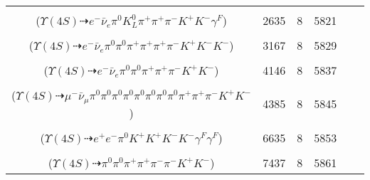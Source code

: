 \documentclass[landscape]{article}
\newcounter{rownumbers}
\newcommand\rn{\stepcounter{rownumbers}\arabic{rownumbers}}
\newcommand{\EOL}{\\} %
\newcommand{\topoTags}[1]{#1} %
\begin{document}
\begin{longtable}{clcccc}
\rn & \makecell[l]{ $ 
\Upsilon(4S) \rightarrow B^{0} \bar{B}^{0} ,
B^{0} \rightarrow \pi^{0} K^{+} K^{-} ,
\bar{B}^{0} \rightarrow e^{-} \bar{\nu}_{e} D^{*+} \gamma^{F} ,
D^{*+} \rightarrow \pi^{+} D^{0} ,
D^{0} \rightarrow K_{L}^{0} \pi^{+} \pi^{-} 
$ \\ ($
\Upsilon(4S) \dashrightarrow e^{-} \bar{\nu}_{e} \pi^{0} K_{L}^{0} \pi^{+} \pi^{+} \pi^{-} K^{+} K^{-} \gamma^{F} 
$) } & \topoTags{2635 & }8 & 5821 \EOL

\rn & \makecell[l]{ $ 
\Upsilon(4S) \rightarrow B^{0} \bar{B}^{0} ,
B^{0} \rightarrow \pi^{0} K^{+} K^{-} ,
\bar{B}^{0} \rightarrow e^{-} \bar{\nu}_{e} D^{*+} ,
D^{*+} \rightarrow \pi^{+} D^{0} ,
D^{0} \rightarrow \pi^{0} \pi^{+} \pi^{-} \bar{K}^{*} ,
\bar{K}^{*} \rightarrow \pi^{+} K^{-} 
$ \\ ($
\Upsilon(4S) \dashrightarrow e^{-} \bar{\nu}_{e} \pi^{0} \pi^{0} \pi^{+} \pi^{+} \pi^{+} \pi^{-} K^{+} K^{-} K^{-} 
$) } & \topoTags{3167 & }8 & 5829 \EOL

\rn & \makecell[l]{ $ 
\Upsilon(4S) \rightarrow B^{0} \bar{B}^{0} ,
B^{0} \rightarrow \pi^{0} K^{+} K^{-} ,
\bar{B}^{0} \rightarrow e^{-} \bar{\nu}_{e} D^{*+} ,
D^{*+} \rightarrow \pi^{+} D^{0} ,
D^{0} \rightarrow \pi^{0} \pi^{+} \pi^{-} 
$ \\ ($
\Upsilon(4S) \dashrightarrow e^{-} \bar{\nu}_{e} \pi^{0} \pi^{0} \pi^{+} \pi^{+} \pi^{-} K^{+} K^{-} 
$) } & \topoTags{4146 & }8 & 5837 \EOL

\rn & \makecell[l]{ $ 
\Upsilon(4S) \rightarrow B^{0} \bar{B}^{0} ,
B^{0} \rightarrow \pi^{0} K^{+} K^{-} ,
\bar{B}^{0} \rightarrow \mu^{-} \bar{\nu}_{\mu} \eta D^{+} ,
\eta \rightarrow \pi^{0} \pi^{0} \pi^{0} ,
D^{+} \rightarrow \pi^{0} \pi^{+} \pi^{+} \pi^{-} \eta ,
\eta \rightarrow \pi^{0} \pi^{0} \pi^{0} 
$ \\ ($
\Upsilon(4S) \dashrightarrow \mu^{-} \bar{\nu}_{\mu} \pi^{0} \pi^{0} \pi^{0} \pi^{0} \pi^{0} \pi^{0} \pi^{0} \pi^{0} \pi^{+} \pi^{+} \pi^{-} K^{+} K^{-} 
$) } & \topoTags{4385 & }8 & 5845 \EOL

\rn & \makecell[l]{ $ 
\Upsilon(4S) \rightarrow B^{0} B^{0} ,
B^{0} \rightarrow \pi^{0} K^{+} K^{-} ,
B^{0} \rightarrow \pi^{0} K^{+} K^{-} \gamma^{F} ,
\pi^{0} \rightarrow e^{+} e^{-} \gamma^{F} 
$ \\ ($
\Upsilon(4S) \dashrightarrow e^{+} e^{-} \pi^{0} K^{+} K^{+} K^{-} K^{-} \gamma^{F} \gamma^{F} 
$) } & \topoTags{6635 & }8 & 5853 \EOL

\rn & \makecell[l]{ $ 
\Upsilon(4S) \rightarrow B^{0} \bar{B}^{0} ,
B^{0} \rightarrow \pi^{0} K^{+} K^{-} ,
\bar{B}^{0} \rightarrow \pi^{-} D^{+} ,
D^{+} \rightarrow \pi^{0} \pi^{+} K_{S}^{0} ,
K_{S}^{0} \rightarrow \pi^{+} \pi^{-} 
$ \\ ($
\Upsilon(4S) \dashrightarrow \pi^{0} \pi^{0} \pi^{+} \pi^{+} \pi^{-} \pi^{-} K^{+} K^{-} 
$) } & \topoTags{7437 & }8 & 5861 \EOL


\end{longtable}
\end{document}
